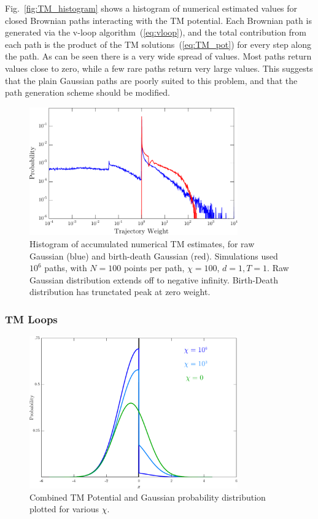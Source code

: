 Fig.~\ref{fig:TM_histogram} shows a histogram of numerical estimated values for closed Brownian paths 
interacting with the TM potential.  Each Brownian path is generated via the v-loop algorithm~(\ref{eq:vloop}),
and the total contribution from each path is the product of the TM solutions~(\ref{eq:TM_pot}) for every
step along the path.
As can be seen there is a very wide spread of values.  Most paths return values close to zero, 
while a few rare paths return very large values.  This suggests that the plain Gaussian paths 
are poorly suited to this problem, and that the path generation scheme should be modified.

\begin{figure}
  \centering
  \includegraphics[width=0.8\textwidth]{fig/numerics/TM_normhist}
  \caption[Histogram of Accumulated Numerical TM Estimates]
  {Histogram of accumulated numerical TM estimates, for raw Gaussian (blue) and birth-death Gaussian (red).
    Simulations used $10^6$ paths, with $N=100$ points per path, $\chi=100$, $d=1,T=1.$
  Raw Gaussian distribution extends off to negative infinity.  Birth-Death  distribution has trunctated peak at zero weight.}
\end{figure}



\subsubsection{TM Loops}

\begin{figure}
  \centering
  \includegraphics[width=0.8\textwidth]{fig/analytical/probTM}
  \caption[Combined TM Potential and Gaussian probability distribution.]{
    Combined TM Potential and Gaussian probability distribution plotted for various $\chi$.}
\end{figure}

